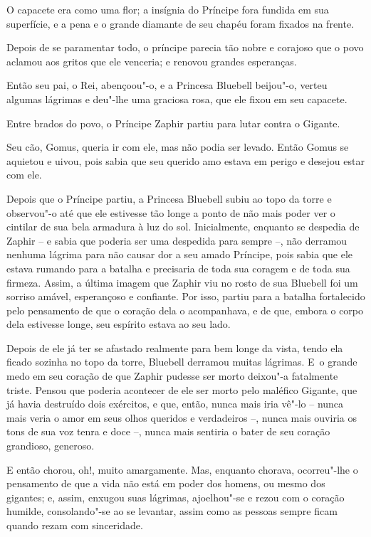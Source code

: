 O capacete era como uma flor; a insígnia do Príncipe fora fundida
em sua superfície, e a pena e o grande diamante de seu chapéu foram fixados na
frente.

Depois de se paramentar todo, o príncipe parecia tão nobre e corajoso
que o povo aclamou aos gritos que ele venceria; e renovou grandes
esperanças.

Então seu pai, o Rei, abençoou"-o, e a Princesa Bluebell beijou"-o, verteu
algumas lágrimas e deu"-lhe uma graciosa rosa, que ele fixou em seu
capacete.

Entre brados do povo, o Príncipe Zaphir partiu para lutar contra o
Gigante.

Seu cão, Gomus, queria ir com ele, mas não podia ser levado. Então Gomus
se aquietou e uivou, pois sabia que seu querido amo estava em perigo e
desejou estar com ele.

Depois que o Príncipe partiu, a Princesa Bluebell subiu ao topo da torre
e observou"-o até que ele estivesse tão longe a ponto de não mais
poder ver o cintilar de sua bela armadura à luz do sol. Inicialmente,
enquanto se despedia de Zaphir -- e sabia que poderia ser
uma despedida para sempre --, não derramou nenhuma lágrima para não causar
dor a seu amado Príncipe, pois sabia que ele estava rumando para a
batalha e precisaria de toda sua coragem e de toda sua firmeza. Assim, a
última imagem que Zaphir viu no rosto de sua Bluebell foi um sorriso
amável, esperançoso e confiante. Por isso, partiu para a batalha
fortalecido pelo pensamento de que o coração dela o acompanhava, e de
que, embora o corpo dela estivesse longe, seu espírito estava ao seu lado.

Depois de ele já ter se afastado realmente para bem longe da vista,
tendo ela ficado sozinha no topo da torre, Bluebell derramou muitas lágrimas.
E~o grande medo em seu coração de que Zaphir pudesse ser morto deixou"-a
fatalmente triste. Pensou que poderia acontecer de ele ser morto pelo
maléfico Gigante, que já havia destruído dois exércitos, e que, então,
nunca mais iria vê"-lo -- nunca mais veria o amor em seus olhos
queridos e verdadeiros --, nunca mais ouviria os tons de sua voz tenra e
doce --, nunca mais sentiria o bater de seu coração grandioso, generoso.

E então chorou, oh!, muito amargamente. Mas, enquanto chorava,
ocorreu"-lhe o pensamento de que a vida não está em poder dos
homens, ou mesmo dos gigantes; e, assim, enxugou suas lágrimas,
ajoelhou"-se e rezou com o coração humilde, consolando"-se ao se
levantar, assim como as pessoas sempre ficam quando rezam com
sinceridade.

